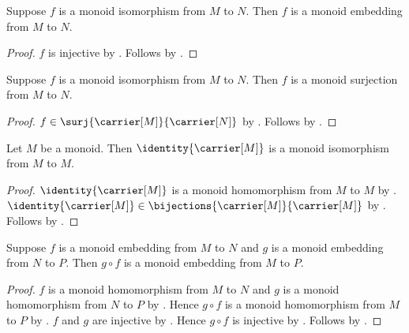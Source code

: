 \begin{corollary}\label{monoid_isomorphism_is_embedding}
    Suppose $f$ is a monoid isomorphism from $M$ to $N$.
    Then $f$ is a monoid embedding from $M$ to $N$.
\end{corollary}
\begin{proof}
    $f$ is injective by
        .
    Follows by
        .
\end{proof}

\begin{corollary}\label{monoid_isomorphism_is_surjection}
    Suppose $f$ is a monoid isomorphism from $M$ to $N$.
    Then $f$ is a monoid surjection from $M$ to $N$.
\end{corollary}
\begin{proof}
    $f\in\surj{\carrier[M]}{\carrier[N]}$ by
        .
    Follows by
        .
\end{proof}

\begin{proposition}\label{identity_monoid_isomorphism}
    Let $M$ be a monoid.
    Then $\identity{\carrier[M]}$ is a monoid isomorphism from $M$ to $M$.
\end{proposition}
\begin{proof}
    $\identity{\carrier[M]}$ is a monoid homomorphism from $M$ to $M$ by
        .
    $\identity{\carrier[M]}\in
        \bijections{\carrier[M]}{\carrier[M]}$ by
        .
    Follows by .
\end{proof}

\begin{theorem}\label{monoid_embedding_composition}
    Suppose $f$ is a monoid embedding from $M$ to $N$ and
        $g$ is a monoid embedding from $N$ to $P$.
    Then $g\circ f$ is a monoid embedding from $M$ to $P$.
\end{theorem}
\begin{proof}
    $f$ is a monoid homomorphism from $M$ to $N$ and
        $g$ is a monoid homomorphism from $N$ to $P$ by
        .
    Hence $g\circ f$ is a monoid homomorphism from $M$ to $P$ by
        .
    $f$ and $g$ are injective by
        .
    Hence $g\circ f$ is injective by .
    Follows by .
\end{proof}

